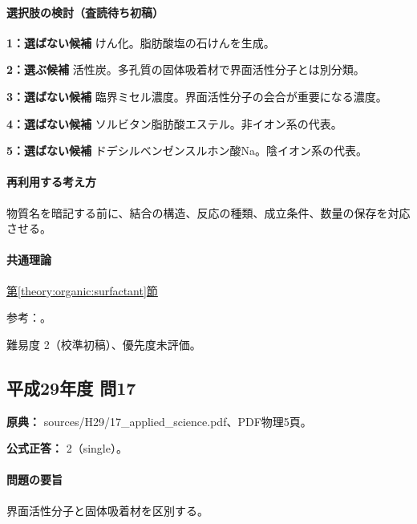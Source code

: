 \paragraph{選択肢の検討（査読待ち初稿）}\mbox{}\par

\noindent\textbf{1：選ばない候補} けん化。脂肪酸塩の石けんを生成。\par

\noindent\textbf{2：選ぶ候補} 活性炭。多孔質の固体吸着材で界面活性分子とは別分類。\par

\noindent\textbf{3：選ばない候補} 臨界ミセル濃度。界面活性分子の会合が重要になる濃度。\par

\noindent\textbf{4：選ばない候補} ソルビタン脂肪酸エステル。非イオン系の代表。\par

\noindent\textbf{5：選ばない候補} ドデシルベンゼンスルホン酸Na。陰イオン系の代表。\par

\paragraph{再利用する考え方} 物質名を暗記する前に、結合の構造、反応の種類、成立条件、数量の保存を対応させる。

\paragraph{共通理論} \hyperref[theory:organic:surfactant]{第\ref*{theory:organic:surfactant}節}

\par 参考：\cite{organic_cmc}。

\par 難易度 2（校準初稿）、優先度未評価。

\subsection{平成29年度 問17}
\label{q:h29-reg-applied-17}

\noindent\textbf{原典：} sources/H29/17\_applied\_science.pdf、PDF物理5頁。

\textbf{公式正答：} 2（single）。

\paragraph{問題の要旨} 界面活性分子と固体吸着材を区別する。

